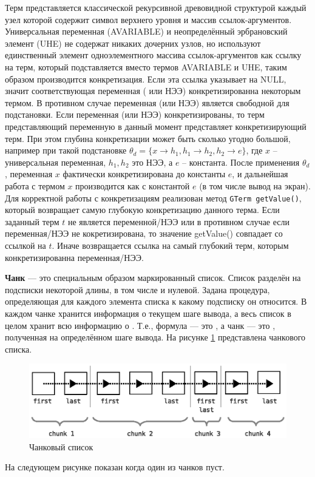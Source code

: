 Терм представляется классической рекурсивной древовидной структурой каждый узел которой содержит символ  верхнего уровня и массив ссылок-аргументов. Универсальная переменная (AVARIABLE) и неопределённый эрбрановский элемент (UHE) не содержат никаких дочерних узлов, но используют единственный элемент одноэлементного массива ссылок-аргументов как ссылку на терм, который подставляется вместо термов AVARIABLE и UHE, таким образом производится конкретизация. Если эта ссылка указывает на NULL, значит соответствующая переменная ( или НЭЭ) конкретизированна некоторым термом. В противном случае переменная (или НЭЭ) является свободной для подстановки. Если переменная (или НЭЭ) конкретизированы, то терм представляющий переменную в данный момент представляет конкретизирующий терм. При этом глубина конкретизации может быть сколько угодно большой, например при такой подстановке ${\theta}_d = \{x \rightarrow h_1, h_1 \rightarrow h_2, h_2 \rightarrow e \}$, где $x$ -- универсальная переменная, $h_1, h_2$ это НЭЭ, а $e$ -- константа. После применения ${\theta}_d$, переменная $x$ фактически конкретизирована до константы $e$, и дальнейшая работа с термом $x$ производится как с константой $e$ (в том числе вывод на экран). Для корректной работы с конкретизациям реализован метод {\tt GTerm getValue()}, который возвращает самую глубокую конкретизацию данного терма. Если заданный терм $t$ не является переменной/НЭЭ или в противном случае если переменная/НЭЭ не кокретизирована, то значение getValue() совпадает со ссылкой на $t$. Иначе возвращается ссылка на самый глубокий терм, которым конкретизированна переменная/НЭЭ.

\textbf{Чанк} --- это специальным образом маркированный список. Список разделён на подсписки некоторой длины, в том числе и нулевой. Задана процедура, определяющая для каждого элемента списка к какому подсписку он относится. В каждом чанке хранится информация о текущем шаге вывода, а весь список в целом хранит всю информацию о . Т.е., формула --- это , а чанк --- это , полученная на определённом шаге вывода. На рисунке \ref{fig:chank1} представлена  чанкового списка.

\begin{figure}[h]
	\centering
	\includegraphics[width=0.6\linewidth]{pics/Chunk.eps}
	\caption{Чанковый список}
	\label{fig:chank1}
\end{figure}
На следующем рисунке показан  когда один из чанков пуст.

